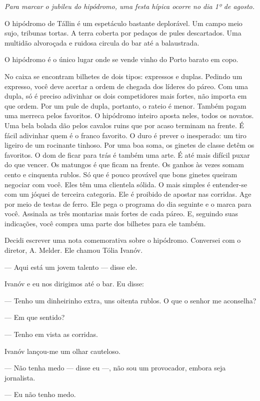 \emph{Para marcar o jubileu do hipódromo, uma festa hípica ocorre no dia
1º de agosto.}

O hipódromo de Tállin é um espetáculo bastante deplorável. Um campo meio
sujo, tribunas tortas. A terra coberta por pedaços de pules descartados.
Uma multidão alvoroçada e ruidosa circula do bar até a balaustrada.

O hipódromo é o único lugar onde se vende vinho do Porto barato em copo.

No caixa se encontram bilhetes de dois tipos: expressos e duplas.
Pedindo um expresso, você deve acertar a ordem de chegada dos líderes do
páreo. Com uma dupla, só é preciso adivinhar os dois competidores mais
fortes, não importa em que ordem. Por um pule de dupla, portanto, o
rateio é menor. Também pagam uma merreca pelos favoritos. O hipódromo
inteiro aposta neles, todos os novatos. Uma bela bolada dão pelos
cavalos ruins que por acaso terminam na frente. É fácil adivinhar quem é
o franco favorito. O duro é prever o inesperado: um tiro ligeiro de um
rocinante tinhoso. Por uma boa soma, os ginetes de classe detêm os
favoritos. O dom de ficar para trás é também uma arte. É até mais
difícil puxar do que vencer. Os matungos é que ficam na frente. Os
ganhos às vezes somam cento e cinquenta rublos. Só que é pouco provável
que bons ginetes queiram negociar com você. Eles têm uma clientela
sólida. O mais simples é entender-se com um jóquei de terceira
categoria. Ele é proibido de apostar nas corridas. Age por meio de
testas de ferro. Ele pega o programa do dia seguinte e o marca para
você. Assinala as três montarias mais fortes de cada páreo. E, seguindo
suas indicações, você compra uma parte dos bilhetes para ele também.

Decidi escrever uma nota comemorativa sobre o hipódromo. Conversei com o
diretor, A. Melder. Ele chamou Tólia Ivanóv.

--- Aqui está um jovem talento --- disse ele.

Ivanóv e eu nos dirigimos até o bar. Eu disse:

--- Tenho um dinheirinho extra, uns oitenta rublos. O que o senhor me
aconselha?

--- Em que sentido?

--- Tenho em vista as corridas.

Ivanóv lançou-me um olhar cauteloso.

--- Não tenha medo --- disse eu ---, não sou um provocador, embora seja
jornalista.

--- Eu não tenho medo.

